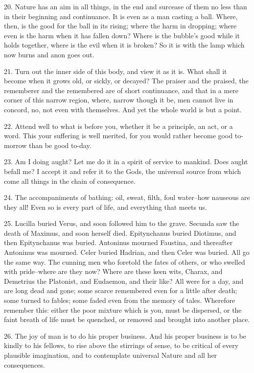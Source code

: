 \documentclass{book}
\begin{document}
20. Nature has an aim in all things, in the end and surcease of them
no less than in their beginning and continuance. It is even as a man
casting a ball. Where, then, is the good for the ball in its rising;
where the harm in dropping; where even is the harm when it has fallen
down? Where is the bubble's good while it holds together, where is the
evil when it is broken? So it is with the lamp which now burns and
anon goes out.

21. Turn out the inner side of this body, and view it as it is. What
shall it become when it grows old, or sickly, or decayed? The praiser
and the praised, the rememberer and the remembered are of short
continuance, and that in a mere corner of this narrow region, where,
narrow though it be, men cannot live in concord, no, not even with
themselves. And yet the whole world is but a point.

22. Attend well to what is before you, whether it be a principle, an
act, or a word. This your suffering is well merited, for you would
rather become good to-morrow than be good to-day.

23. Am I doing aught? Let me do it in a spirit of service to
mankind. Does aught befall me? I accept it and refer it to the Gods,
the universal source from which come all things in the chain of
consequence.

24. The accompaniments of bathing: oil, sweat, filth, foul water--how
nauseous are they all! Even so is every part of life, and everything
that meets us.

25. Lucilla buried Verus, and soon followed him to the grave. Secunda
saw the death of Maximus, and soon herself died. Epitynchanus buried
Diotimus, and then Epitynchanus was buried. Antoninus mourned
Faustina, and thereafter Antoninus was mourned. Celer buried Hadrian,
and then Celer was buried. All go the same way. The cunning men who
foretold the fates of others, or who swelled with pride--where are
they now? Where are these keen wits, Charax, and Demetrius the
Platonist, and Eudaemon, and their like? All were for a day, and are
long dead and gone; some scarce remembered even for a little after
death; some turned to fables; some faded even from the memory of
tales. Wherefore remember this: either the poor mixture which is you,
must be dispersed, or the faint breath of life must be quenched, or
removed and brought into another place.

26. The joy of man is to do his proper business. And his proper
business is to be kindly to his fellows, to rise above the stirrings
of sense, to be critical of every plausible imagination, and to
contemplate universal Nature and all her consequences.
\end{document}

